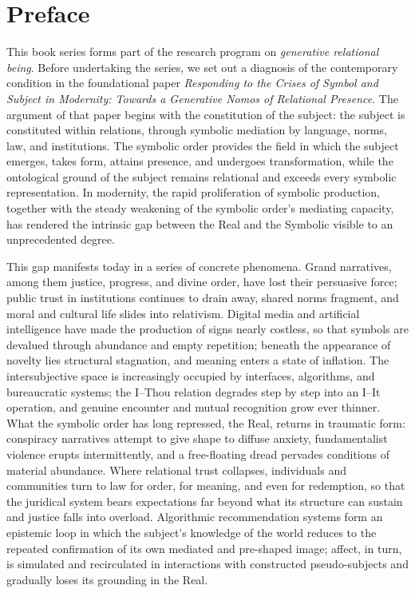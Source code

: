 \documentclass[11pt]{book}
\begin{document}
\frontmatter

\chapter*{Preface}

This book series forms part of the research program on \emph{generative relational being}. Before undertaking the series, we set out a diagnosis of the contemporary condition in the foundational paper \emph{Responding to the Crises of Symbol and Subject in Modernity: Towards a Generative Nomos of Relational Presence}. The argument of that paper begins with the constitution of the subject: the subject is constituted within relations, through symbolic mediation by language, norms, law, and institutions. The symbolic order provides the field in which the subject emerges, takes form, attains presence, and undergoes transformation, while the ontological ground of the subject remains relational and exceeds every symbolic representation. In modernity, the rapid proliferation of symbolic production, together with the steady weakening of the symbolic order's mediating capacity, has rendered the intrinsic gap between the Real and the Symbolic visible to an unprecedented degree.

This gap manifests today in a series of concrete phenomena. Grand narratives, among them justice, progress, and divine order, have lost their persuasive force; public trust in institutions continues to drain away, shared norms fragment, and moral and cultural life slides into relativism. Digital media and artificial intelligence have made the production of signs nearly costless, so that symbols are devalued through abundance and empty repetition; beneath the appearance of novelty lies structural stagnation, and meaning enters a state of inflation. The intersubjective space is increasingly occupied by interfaces, algorithms, and bureaucratic systems; the I--Thou relation degrades step by step into an I--It operation, and genuine encounter and mutual recognition grow ever thinner. What the symbolic order has long repressed, the Real, returns in traumatic form: conspiracy narratives attempt to give shape to diffuse anxiety, fundamentalist violence erupts intermittently, and a free-floating dread pervades conditions of material abundance. Where relational trust collapses, individuals and communities turn to law for order, for meaning, and even for redemption, so that the juridical system bears expectations far beyond what its structure can sustain and justice falls into overload. Algorithmic recommendation systems form an epistemic loop in which the subject's knowledge of the world reduces to the repeated confirmation of its own mediated and pre-shaped image; affect, in turn, is simulated and recirculated in interactions with constructed pseudo-subjects and gradually loses its grounding in the Real.
\end{document}
